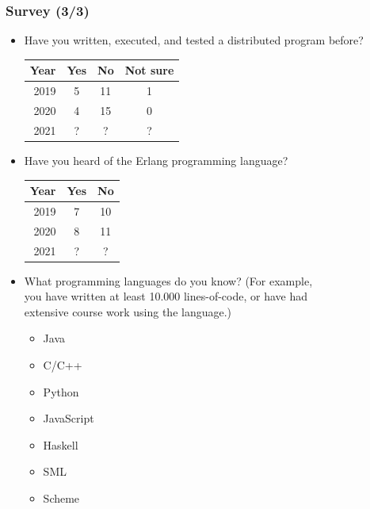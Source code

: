 \begin{frame}

\frametitle{Survey (3/3)}

\begin{itemize}

\footnotesize

\item Have you written, executed, and tested a distributed program before?

\begin{tabular}{|r|c|c|c|}
\hline
\textbf{Year} & \textbf{Yes} & \textbf{No} & \textbf{Not sure}
\\\hline
2019 & 5 & 11 & 1 \\\hline
2020 & 4 & 15 & 0 \\\hline
2021 & ? & ? & ? \\\hline
\end{tabular}

\item Have you heard of the Erlang programming language?

\begin{tabular}{|r|c|c|}
\hline
\textbf{Year} & \textbf{Yes} & \textbf{No}
\\\hline
2019 & 7 & 10 \\\hline
2020 & 8 & 11 \\\hline
2021 & ? & ? \\\hline
\end{tabular}

\item What programming languages do you know? (For example,\\ you have
written at least 10.000 lines-of-code, or have had\\ extensive course
work using the language.)

\vspace{-0.1in}

\begin{multicols}{2}
\begin{itemize}

\item Java

\item C/C++

\item Python

\item JavaScript

\item Haskell

\item SML

\item Scheme

\end{itemize}
\end{multicols}

\end{itemize}

\end{frame}
